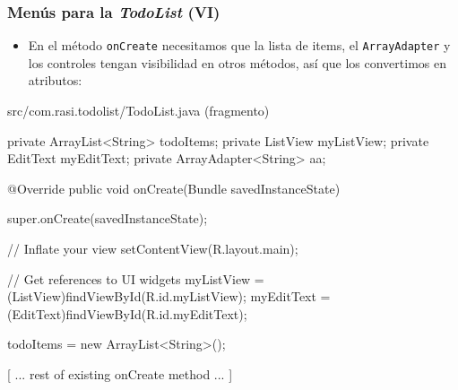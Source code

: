 \documentclass[hyperref={pdfpagelabels=true},ucs]{beamer}
\begin{document}
\begin{frame}[fragile,shrink=5]
\frametitle{Menús para la \emph{TodoList} (VI)}

\begin{itemize}
\item En el método \verb|onCreate| necesitamos que la lista de items, el
  \verb|ArrayAdapter| y los controles tengan visibilidad en otros
  métodos, así que los convertimos en atributos:
\end{itemize}

\begin{tiny}
\begin{block}{src/com.rasi.todolist/TodoList.java (fragmento)}
\begin{java}
private ArrayList<String> todoItems;
private ListView myListView;
private EditText myEditText;
private ArrayAdapter<String> aa;

@Override
public void onCreate(Bundle savedInstanceState) {
  super.onCreate(savedInstanceState);

  // Inflate your view
  setContentView(R.layout.main);

  // Get references to UI widgets
  myListView = (ListView)findViewById(R.id.myListView);
  myEditText = (EditText)findViewById(R.id.myEditText);

  todoItems = new ArrayList<String>();

  [ ... rest of existing onCreate method ... ]

}
\end{java}
\end{block}
\end{tiny}

\end{frame}
\end{document}
